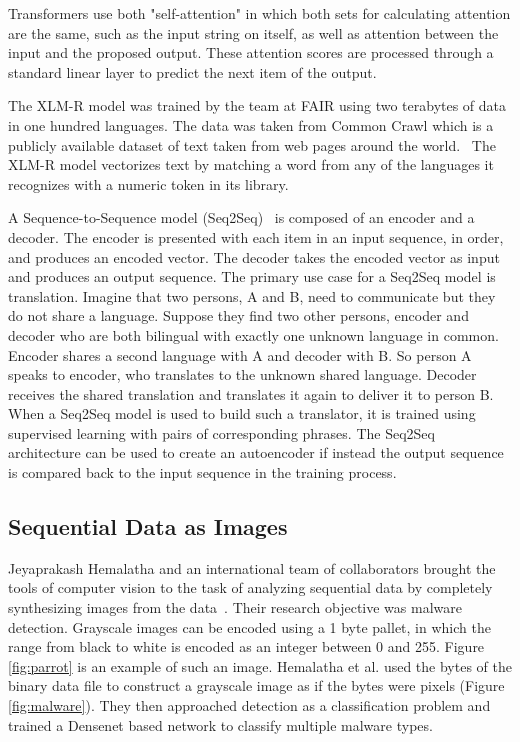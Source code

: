 Transformers use both "self-attention" in which both sets for calculating
attention are the same, such as the input string on itself, as well as
attention between the input and the proposed output. These attention scores are
processed through a standard linear layer to predict the next item of the
output.

The XLM-R model was trained by the team at FAIR using two terabytes of data in
one hundred languages.  The data was taken from Common Crawl which is a
publicly available dataset of text taken from web pages around the
world.~\cite{common_crawl_what_2022} The XLM-R model vectorizes text by
matching a word from any of the languages it recognizes with a numeric token in
its library.

A Sequence-to-Sequence model (Seq2Seq)~\cite{sutskever_sequence_2014} is
composed of an encoder and a decoder. The encoder is presented with each item
in an input sequence, in order, and produces an encoded vector. The decoder
takes the encoded vector as input and produces an output sequence. The primary
use case for a Seq2Seq model is translation.  Imagine that two persons, A and
B, need to communicate but they do not share a language.  Suppose they find two
other persons, encoder and decoder who are both bilingual with exactly one
unknown language in common. Encoder shares a second language with A and decoder
with B.  So person A speaks to encoder, who translates to the unknown shared
language.  Decoder receives the shared translation and translates it again to
deliver it to person B. When a Seq2Seq model is used to build such a
translator, it is trained using supervised learning with pairs of corresponding
phrases.  The Seq2Seq architecture can be used to create an autoencoder if
instead the output sequence is compared back to the input sequence in the
training process.

\subsection{Sequential Data as Images}

Jeyaprakash Hemalatha and an international team of collaborators brought the
tools of computer vision to the task of analyzing sequential data by completely
synthesizing images from the data~\cite{hemalatha_efficient_2021}.  Their
research objective was malware detection.  Grayscale images can be encoded
using a 1 byte pallet, in which the range from black to white is encoded as an
integer between 0 and 255. Figure \ref{fig:parrot} is an example of such an
image. Hemalatha et al. used the bytes of the binary data file to construct a
grayscale image as if the bytes were pixels (Figure \ref{fig:malware}). They
then approached detection as a classification problem and trained a Densenet
based network to classify multiple malware types.

